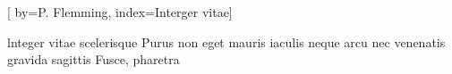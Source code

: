 [
by={P. Flemming},
index={Interger vitae}]

\beginverse*	
lnteger vitae scelerisque Purus
non eget mauris iaculis neque arcu
nec venenatis
gravida sagittis
Fusce, pharetra 
\endverse
\endsong


